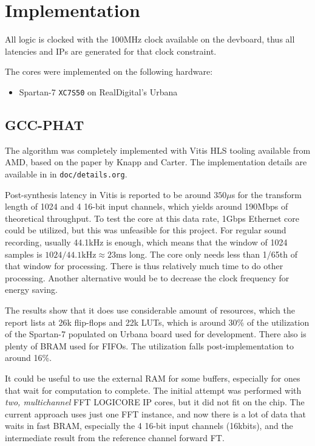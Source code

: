 \documentclass[a4paper,twocolumn]{article}
\begin{document}
\section{Implementation}

All logic is clocked with the 100MHz clock available on the devboard,
thus all latencies and IPs are generated for that clock
constraint.

The cores were implemented on the following hardware:
\begin{itemize}
\item Spartan-7 \texttt{XC7S50} on RealDigital's Urbana\cite{urbana}
\end{itemize}

\subsection{GCC-PHAT}

The algorithm was completely implemented with Vitis HLS tooling
available from AMD, based on the paper by Knapp and
Carter\cite{gccphat}. The implementation details are available in in
\texttt{doc/details.org}.

Post-synthesis latency in Vitis is reported to be around $350\mu$s for
the transform length of 1024 and 4 16-bit input channels, which yields
around 190Mbps of theoretical throughput. To test the core at this
data rate, 1Gbps Ethernet core could be utilized, but this was
unfeasible for this project. For regular sound recording, usually
44.1kHz is enough, which means that the window of 1024 samples is
$1024 / 44.1\mathrm{kHz} \approx 23\mathrm{ms}$ long. The core only
needs less than 1/65th of that window for processing. There is thus
relatively much time to do other processing. Another alternative would
be to decrease the clock frequency for energy saving.

The results show that it does use considerable amount of resources,
which the report lists at 26k flip-flops and 22k LUTs, which is around
30\% of the utilization of the Spartan-7 populated on Urbana board
used for development. There also is plenty of BRAM used for FIFOs. The
utilization falls post-implementation to around 16\%.

It could be useful to use the external RAM for some buffers,
especially for ones that wait for computation to complete. The initial
attempt was performed with \emph{two, multichannel} FFT LOGICORE IP
cores, but it did not fit on the chip. The current approach uses just
one FFT instance, and now there is a lot of data that waits in fast
BRAM, especially the 4 16-bit input channels (16kbits), and the intermediate
result from the reference channel forward FT.
\end{document}
